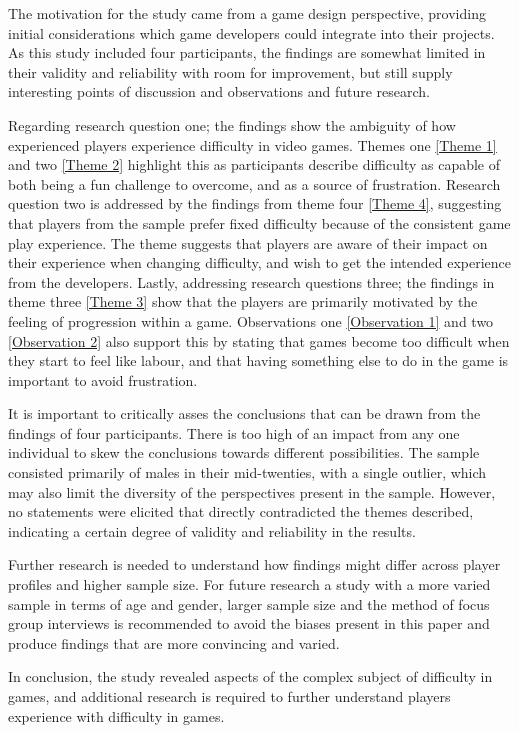 The motivation for the study came from a game design perspective, providing initial considerations which game developers could integrate into their projects. As this study included four participants, the findings are somewhat limited in their validity and reliability with room for improvement, but still supply interesting points of discussion and observations and future research.

Regarding research question one; the findings show the ambiguity of how experienced players experience difficulty in video games. Themes one \ref{Theme 1} and two \ref{Theme 2} highlight this as participants describe difficulty as capable of both being a fun challenge to overcome, and as a source of frustration. Research question two is addressed by the findings from theme four \ref{Theme 4}, suggesting that players from the sample prefer fixed difficulty because of the consistent game play experience. The theme suggests that players are aware of their impact on their experience when changing difficulty, and wish to get the intended experience from the developers. Lastly, addressing research questions three; the findings in theme three \ref{Theme 3} show that the players are primarily motivated by the feeling of progression within a game. Observations one \ref{Observation 1} and two \ref{Observation 2} also support this by stating that games become too difficult when they start to feel like labour, and that having something else to do in the game is important to avoid frustration.

It is important to critically asses the conclusions that can be drawn from the findings of four participants. There is too high of an impact from any one individual to skew the conclusions towards different possibilities. The sample consisted primarily of males in their mid-twenties, with a single outlier, which may also limit the diversity of the perspectives present in the sample.  However, no statements were elicited that directly contradicted the themes described, indicating a certain degree of validity and reliability in the results.

Further research is needed to understand how findings might differ across player profiles and higher sample size. For future research a study with a more varied sample in terms of age and gender, larger sample size and the method of focus group interviews is recommended to avoid the biases present in this paper and produce findings that are more convincing and varied.

In conclusion, the study revealed aspects of the complex subject of difficulty in games, and additional research is required to further understand players experience with difficulty in games.

\clearpage